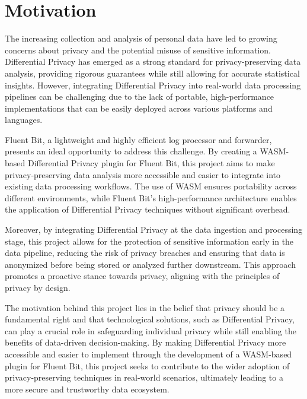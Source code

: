 \section{Motivation}
The increasing collection and analysis of personal data have led to growing concerns about privacy and the potential misuse of sensitive information. Differential Privacy has emerged as a strong standard for privacy-preserving data analysis, providing rigorous guarantees while still allowing for accurate statistical insights. However, integrating Differential Privacy into real-world data processing pipelines can be challenging due to the lack of portable, high-performance implementations that can be easily deployed across various platforms and languages.

Fluent Bit, a lightweight and highly efficient log processor and forwarder, presents an ideal opportunity to address this challenge. By creating a WASM-based Differential Privacy plugin for Fluent Bit, this project aims to make privacy-preserving data analysis more accessible and easier to integrate into existing data processing workflows. The use of WASM ensures portability across different environments, while Fluent Bit's high-performance architecture enables the application of Differential Privacy techniques without significant overhead.

Moreover, by integrating Differential Privacy at the data ingestion and processing stage, this project allows for the protection of sensitive information early in the data pipeline, reducing the risk of privacy breaches and ensuring that data is anonymized before being stored or analyzed further downstream. This approach promotes a proactive stance towards privacy, aligning with the principles of privacy by design.

The motivation behind this project lies in the belief that privacy should be a fundamental right and that technological solutions, such as Differential Privacy, can play a crucial role in safeguarding individual privacy while still enabling the benefits of data-driven decision-making. By making Differential Privacy more accessible and easier to implement through the development of a WASM-based plugin for Fluent Bit, this project seeks to contribute to the wider adoption of privacy-preserving techniques in real-world scenarios, ultimately leading to a more secure and trustworthy data ecosystem.